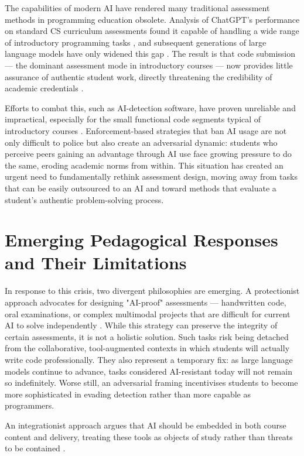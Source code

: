 The capabilities of modern AI have rendered many traditional assessment methods in programming education obsolete. Analysis of ChatGPT's performance on standard CS curriculum assessments found it capable of handling a wide range of introductory programming tasks \cite{Qureshi2023}, and subsequent generations of large language models have only widened this gap \cite{Huckins2025}. The result is that code submission — the dominant assessment mode in introductory courses — now provides little assurance of authentic student work, directly threatening the credibility of academic credentials \cite{Humble2024}.

Efforts to combat this, such as AI-detection software, have proven unreliable and impractical, especially for the small functional code segments typical of introductory courses \cite{Finnie-Ansley2022}. Enforcement-based strategies that ban AI usage are not only difficult to police but also create an adversarial dynamic: students who perceive peers gaining an advantage through AI use face growing pressure to do the same, eroding academic norms from within. This situation has created an urgent need to fundamentally rethink assessment design, moving away from tasks that can be easily outsourced to an AI and toward methods that evaluate a student's authentic problem-solving process.

\section{Emerging Pedagogical Responses and Their Limitations}

In response to this crisis, two divergent philosophies are emerging. A protectionist approach advocates for designing "AI-proof" assessments — handwritten code, oral examinations, or complex multimodal projects that are difficult for current AI to solve independently \cite{Lau2023}. While this strategy can preserve the integrity of certain assessments, it is not a holistic solution. Such tasks risk being detached from the collaborative, tool-augmented contexts in which students will actually write code professionally. They also represent a temporary fix: as large language models continue to advance, tasks considered AI-resistant today will not remain so indefinitely. Worse still, an adversarial framing incentivises students to become more sophisticated in evading detection rather than more capable as programmers.

An integrationist approach argues that AI should be embedded in both course content and delivery, treating these tools as objects of study rather than threats to be contained \cite{Cambaz2024}.

